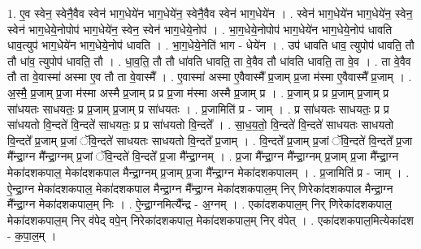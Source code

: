 \documentclass[17pt]{extarticle}
\begin{document}
1. ए॒व स्वेन॒ स्वेनै॒वैव स्वेन॑ भाग॒धेये॑न भाग॒धेये॑न॒ स्वेनै॒वैव स्वेन॑ भाग॒धेये॑न । . स्वेन॑ भाग॒धेये॑न भाग॒धेये॑न॒ स्वेन॒ स्वेन॑ भाग॒धेये॒नोपोप॑ भाग॒धेये॑न॒ स्वेन॒ स्वेन॑ भाग॒धेये॒नोप॑ । . भा॒ग॒धेये॒नोपोप॑ भाग॒धेये॑न भाग॒धेये॒नोप॑ धावति धाव॒त्युप॑ भाग॒धेये॑न भाग॒धेये॒नोप॑ धावति । . भा॒ग॒धेये॒नेति॑ भाग - धेये॑न । . उप॑ धावति धाव॒ त्युपोप॑ धावति॒ तौ तौ धा॑व॒ त्युपोप॑ धावति॒ तौ । . धा॒व॒ति॒ तौ तौ धा॑वति धावति॒ ता वे॒वैव तौ धा॑वति धावति॒ ता वे॒व । . ता वे॒वैव तौ ता वे॒वास्मा॑ अस्मा ए॒व तौ ता वे॒वास्मै᳚ । . ए॒वास्मा॑ अस्मा ए॒वैवास्मै᳚ प्र॒जाम् प्र॒जा म॑स्मा ए॒वैवास्मै᳚ प्र॒जाम् । . अ॒स्मै॒ प्र॒जाम् प्र॒जा म॑स्मा अस्मै प्र॒जाम् प्र प्र प्र॒जा म॑स्मा अस्मै प्र॒जाम् प्र । . प्र॒जाम् प्र प्र प्र॒जाम् प्र॒जाम् प्र सा॑धयतः साधयतः॒ प्र प्र॒जाम् प्र॒जाम् प्र सा॑धयतः । . प्र॒जामिति॑ प्र - जाम् । . प्र सा॑धयतः साधयतः॒ प्र प्र सा॑धयतो वि॒न्दते॑ वि॒न्दते॑ साधयतः॒ प्र प्र सा॑धयतो वि॒न्दते᳚ । . सा॒ध॒य॒तो॒ वि॒न्दते॑ वि॒न्दते॑ साधयतः साधयतो वि॒न्दते᳚ प्र॒जाम् प्र॒जां ॅवि॒न्दते॑ साधयतः साधयतो वि॒न्दते᳚ प्र॒जाम् । . वि॒न्दते᳚ प्र॒जाम् प्र॒जां ॅवि॒न्दते॑ वि॒न्दते᳚ प्र॒जा मै᳚न्द्रा॒ग्न मै᳚न्द्रा॒ग्नम् प्र॒जां ॅवि॒न्दते॑ वि॒न्दते᳚ प्र॒जा मै᳚न्द्रा॒ग्नम् । . प्र॒जा मै᳚न्द्रा॒ग्न मै᳚न्द्रा॒ग्नम् प्र॒जाम् प्र॒जा मै᳚न्द्रा॒ग्न मेका॑दशकपाल॒ मेका॑दशकपाल मैन्द्रा॒ग्नम् प्र॒जाम् प्र॒जा मै᳚न्द्रा॒ग्न मेका॑दशकपालम् । . प्र॒जामिति॑ प्र - जाम् । . ऐ॒न्द्रा॒ग्न मेका॑दशकपाल॒ मेका॑दशकपाल मैन्द्रा॒ग्न मै᳚न्द्रा॒ग्न मेका॑दशकपाल॒म् निर् णिरेका॑दशकपाल मैन्द्रा॒ग्न मै᳚न्द्रा॒ग्न मेका॑दशकपाल॒म् निः । . ऐ॒न्द्रा॒ग्नमित्यै᳚न्द्र - अ॒ग्नम् । . एका॑दशकपाल॒म् निर् णिरेका॑दशकपाल॒ मेका॑दशकपाल॒म् निर् व॑पेद् वपे॒न् निरेका॑दशकपाल॒ मेका॑दशकपाल॒म् निर् व॑पेत् । . एका॑दशकपाल॒मित्येका॑दश - क॒पा॒ल॒म् । \newline
\end{document}
